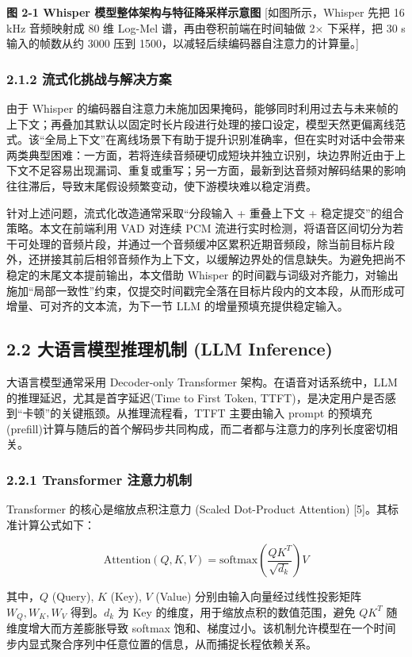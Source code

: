 \documentclass[UTF8,a4paper,12pt]{ctexart}
\begin{document}
\textbf{图 2-1 Whisper 模型整体架构与特征降采样示意图} [如图所示，Whisper 先把 16 kHz 音频映射成 80 维 Log-Mel 谱，再由卷积前端在时间轴做 2× 下采样，把 30 s 输入的帧数从约 3000 压到 1500，以减轻后续编码器自注意力的计算量。]

\subsubsection*{2.1.2 流式化挑战与解决方案}


由于 Whisper 的编码器自注意力未施加因果掩码，能够同时利用过去与未来帧的上下文；再叠加其默认以固定时长片段进行处理的接口设定，模型天然更偏离线范式。该“全局上下文”在离线场景下有助于提升识别准确率，但在实时对话中会带来两类典型困难：一方面，若将连续音频硬切成短块并独立识别，块边界附近由于上下文不足容易出现漏词、重复或重写；另一方面，最新到达音频对解码结果的影响往往滞后，导致末尾假设频繁变动，使下游模块难以稳定消费。

针对上述问题，流式化改造通常采取“分段输入 + 重叠上下文 + 稳定提交”的组合策略。本文在前端利用 VAD 对连续 PCM 流进行实时检测，将语音区间切分为若干可处理的音频片段，并通过一个音频缓冲区累积近期音频段，除当前目标片段外，还拼接其前后相邻音频作为上下文，以缓解边界处的信息缺失。为避免把尚不稳定的末尾文本提前输出，本文借助 Whisper 的时间戳与词级对齐能力，对输出施加“局部一致性”约束，仅提交时间戳完全落在目标片段内的文本段，从而形成可增量、可对齐的文本流，为下一节 LLM 的增量预填充提供稳定输入。

\subsection*{2.2 大语言模型推理机制 (LLM Inference)}


大语言模型通常采用 Decoder-only Transformer 架构。在语音对话系统中，LLM 的推理延迟，尤其是首字延迟(Time to First Token, TTFT)，是决定用户是否感到“卡顿”的关键瓶颈。从推理流程看，TTFT 主要由输入 prompt 的预填充(prefill)计算与随后的首个解码步共同构成，而二者都与注意力的序列长度密切相关。

\subsubsection*{2.2.1 Transformer 注意力机制}


Transformer 的核心是缩放点积注意力 (Scaled Dot-Product Attention) [5]。其标准计算公式如下：  

\[
\text{Attention}(Q, K, V) = \text{softmax}\left(\frac{QK^T}{\sqrt{d_k}}\right)V
\]


其中，$Q$ (Query), $K$ (Key), $V$ (Value) 分别由输入向量经过线性投影矩阵 $W_Q, W_K, W_V$ 得到。$d_k$ 为 Key 的维度，用于缩放点积的数值范围，避免 $QK^T$ 随维度增大而方差膨胀导致 softmax 饱和、梯度过小。该机制允许模型在一个时间步内显式聚合序列中任意位置的信息，从而捕捉长程依赖关系。
\end{document}
